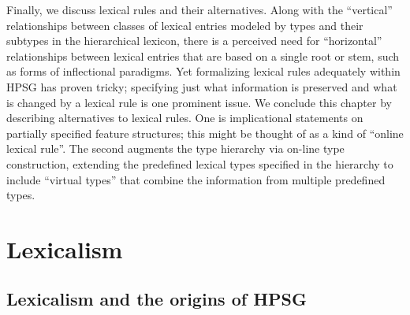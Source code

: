 \documentclass[output=paper]{langsci/langscibook}
\begin{document}
Finally, we discuss lexical rules and their alternatives.  Along with the ``vertical'' relationships between classes of lexical entries modeled by types and their subtypes in the hierarchical lexicon, there is a perceived need for ``horizontal'' relationships between lexical entries that are based on a single root or stem, such as forms of inflectional paradigms.  Yet formalizing lexical rules adequately within HPSG has proven tricky; specifying just what information is preserved and what is changed by a lexical rule is one prominent issue.  We conclude this chapter by describing alternatives to lexical rules.  One is implicational statements on partially specified feature structures; this might be thought of as a kind of ``online lexical rule''.  The second augments the type hierarchy via on-line type construction, extending the predefined lexical types specified in the hierarchy to include ``virtual types'' that combine the information from multiple predefined types.


\section{Lexicalism}
\label{sec:lex}
\subsection{Lexicalism and the origins of HPSG}
\end{document}
